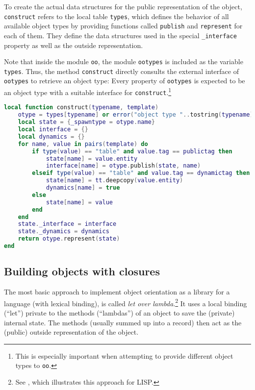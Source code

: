 To create the actual data structures for the public representation of the object, \texttt{construct} refers to the local table \texttt{types}, which defines the behavior of all available object types by providing functions called \texttt{publish} and \texttt{represent} for each of them. They define the data structures used in the special \texttt{\_interface} property as well as the outside representation.

Note that inside the module \texttt{oo}, the module \texttt{ootypes} is included as the variable \texttt{types}. Thus, the method \texttt{construct} directly consults the external interface of \texttt{ootypes} to retrieve an object type: Every property of \texttt{ootypes} is expected to be an object type with a suitable interface for \texttt{construct}.\footnote{This is especially important when attempting to provide different object types to \texttt{oo}.}

\begin{lstlisting}[language=lua, caption={The definition of \texttt{construct} from \texttt{"oo.lua"}}, label=lst:construct, name=lst:construct]
local function construct(typename, template)
    otype = types[typename] or error("object type "..tostring(typename).." doesn't exist")
    local state = {_spawntype = otype.name}
    local interface = {}
    local dynamics = {}
    for name, value in pairs(template) do
        if type(value) == "table" and value.tag == publictag then
            state[name] = value.entity
            interface[name] = otype.publish(state, name)
        elseif type(value) == "table" and value.tag == dynamictag then 
            state[name] = tt.deepcopy(value.entity)
            dynamics[name] = true
        else
            state[name] = value
        end
    end
    state._interface = interface
    state._dynamics = dynamics
    return otype.represent(state)
end
\end{lstlisting}


\subsection{Building objects with closures}

The most basic approach to implement object orientation as a library for a language (with lexical binding), is called \emph{let over lambda}.\footnote{See \cite{Hoyte2008}, which illustrates this approach for LISP.} It uses a local binding (``let'') private to the methods (``lambdas'') of an object to save the (private) internal state. The methods (usually summed up into a record) then act as the (public) outside representation of the object.

